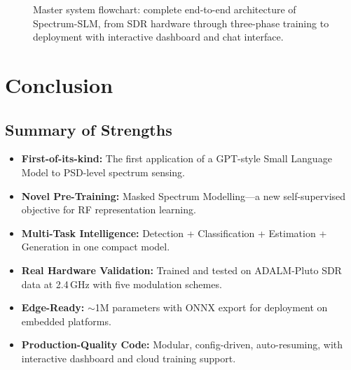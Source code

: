 \documentclass[12pt,a4paper]{article}
\begin{document}
\begin{figure}[H]
\caption{Master system flowchart: complete end-to-end architecture of Spectrum-SLM, from SDR hardware through three-phase training to deployment with interactive dashboard and chat interface.}
\end{figure}

\section{Conclusion}

\subsection{Summary of Strengths}
\begin{itemize}[leftmargin=1.5em]
\item \textbf{First-of-its-kind:} The first application of a GPT-style Small Language Model to PSD-level spectrum sensing.
\item \textbf{Novel Pre-Training:} Masked Spectrum Modelling---a new self-supervised objective for RF representation learning.
\item \textbf{Multi-Task Intelligence:} Detection + Classification + Estimation + Generation in one compact model.
\item \textbf{Real Hardware Validation:} Trained and tested on ADALM-Pluto SDR data at 2.4\,GHz with five modulation schemes.
\item \textbf{Edge-Ready:} $\sim$1M parameters with ONNX export for deployment on embedded platforms.
\item \textbf{Production-Quality Code:} Modular, config-driven, auto-resuming, with interactive dashboard and cloud training support.
\end{itemize}
\end{document}
